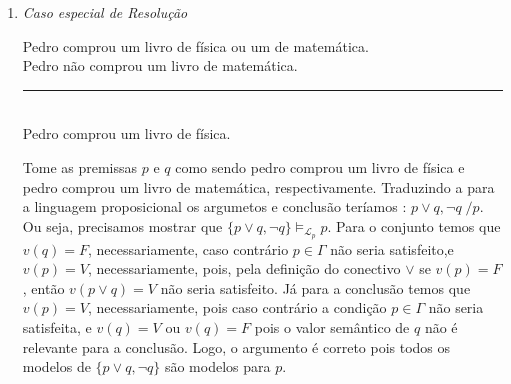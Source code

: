 \begin{enumerate}[label=\arabic*., left=0.5cm, align=left, nosep]
\begin{enumerate}[label=(\alph*), left=0.5cm, align=left, nosep]
                        Tome as premissas $p,q$ e $r$ como sendo Pedro comprou um livro de física, Pedro comprou um livro de 
                        matemática e Pedro foi ao cinema, respectivamente. Traduzindo a para a linguagem proposicional os argumetos 
                        e conclusão teríamos : $ p \lor q, \neg q \lor r \; \ p \lor r$. Ou seja, precisamos mostrar que 
                        $\{ p \lor q, \neg q \lor r \} \models_{\mathcal{L}_p} p \lor r$. Para o conjunto temos que os seguintes 
                        modelos os satisfazem : $v_0(p) = V, v_0(q) = V, v_0(r) = V$; $v_1(p) = V, v_1(q) = F, v_1(r) = V$; $v_2(p)
                        = V, v_2(q) = F, v_2(r) = F$ e $v_3(p) = F, v_3(q) = V, v_3(r) = V$. Já para a conclusão temos que os 
                        seguintes modelos os satisfazem : $v_4(p) = V, v_4(r) =V $; $v_5(p) = V, v_5(r) = F$ e $v_6(p) = F, v_6(r) = 
                        V$, o valor de $q$ é irrelevante pois a conclusão não depende dele. Logo, o argumento é correto pois todos 
                        os modelos de $\{ p \lor q, \neg q \lor r \}$ são modelos para $p \lor r$.
                        
                    \item \textit{Caso especial de Resolução}  
                        
                        Pedro comprou um livro de física ou um de matemática.\\
                        Pedro não comprou um livro de matemática.\\  
                        \rule{7cm}{0.4pt}\\
                        Pedro comprou um livro de física.
                    
                        Tome as premissas $p$ e $q$ como sendo pedro comprou um livro de física e pedro comprou um livro de matemática,
                        respectivamente. Traduzindo a para a linguagem proposicional os argumetos e conclusão teríamos : $p \lor q, 
                        \neg q \; / p$. Ou seja, precisamos mostrar que $\{ p \lor q, \neg q \} \models_{\mathcal{L}_p} p$. Para o 
                        conjunto temos que $v(q) = F$, necessariamente, caso contrário $p \in \Gamma$ não seria satisfeito,e $v(p) = 
                        V$, necessariamente, pois, pela definição do conectivo $\lor$ se $v(p) = F$, então $v(p \lor q) = V$ não 
                        seria satisfeito. Já para a conclusão temos que $v(p) = V$, necessariamente, pois caso contrário a condição
                        $p \in \Gamma$ não seria satisfeita, e $v(q) = V$ ou $v(q) = F$ pois o valor semântico de $q$ não é relevante
                        para a conclusão. Logo, o argumento é correto pois todos os modelos de $\{p \lor q, \neg q\}$ são 
                        modelos para $p$.
                \end{enumerate} 
            

\end{enumerate}

